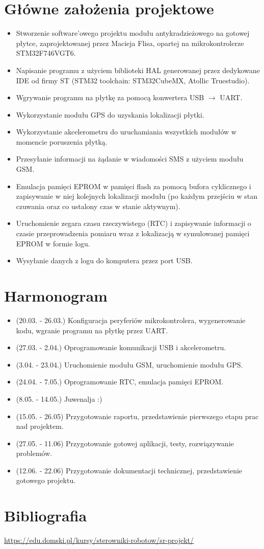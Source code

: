 \documentclass[12pt,a4paper]{article}
\begin{document}
\maketitle
\normalsize

\section{Główne założenia projektowe}
\begin{itemize}
\item Stworzenie software'owego projektu modułu antykradzieżowego na gotowej płytce, zaprojektowanej przez Macieja Flisa, opartej na mikrokontrolerze STM32F746VGT6.
\item Napisanie programu z użyciem biblioteki HAL generowanej przez dedykowane IDE od firmy ST (STM32 toolchain: STM32CubeMX, Atollic Truestudio).
\item Wgrywanie programu na płytkę za pomocą konwertera USB $\rightarrow$ UART.
\item Wykorzystanie modułu GPS do uzyskania lokalizacji płytki.
\item Wykorzystanie akcelerometru do uruchamiania wszystkich modułów w momencie poruszenia płytką.
\item Przesyłanie informacji na żądanie w wiadomości SMS z użyciem modułu GSM.
\item Emulacja pamięci EPROM w pamięci flash za pomocą bufora cyklicznego i zapisywanie w niej kolejnych lokalizacji modułu (po każdym przejściu w stan czuwania oraz co ustalony czas w stanie aktywnym).
\item Uruchomienie zegara czasu rzeczywistego (RTC) i zapisywanie informacji o czasie przeprowadzenia pomiaru wraz z lokalizacją w symulowanej pamięci EPROM w formie logu.
\item Wysyłanie danych z logu do komputera przez port USB.
\end{itemize}

\section{Harmonogram}
\begin{itemize}
\item (20.03. - 26.03.) Konfiguracja peryferiów mikrokontrolera, wygenerowanie kodu, wgranie programu na płytkę przez UART.
\item (27.03. - 2.04.) Oprogramowanie komunikacji USB i akcelerometru.
\item (3.04. - 23.04.) Uruchomienie modułu GSM, uruchomienie modułu GPS.
\item (24.04. - 7.05.) Oprogramowanie RTC, emulacja pamięci EPROM.
\item (8.05. - 14.05.) Juwenalja :)
\item (15.05. - 26.05) Przygotowanie raportu, przedstawienie pierwszego etapu prac nad projektem.
\item (27.05. - 11.06) Przygotowanie gotowej aplikacji, testy, rozwiązywanie problemów.
\item (12.06. - 22.06) Przygotowanie dokumentacji technicznej, przedstawienie gotowego projektu.
\end{itemize}

\tableofcontents

\section{Bibliografia}
\url{https://edu.domski.pl/kursy/sterowniki-robotow/sr-projekt/}
\end{document}
